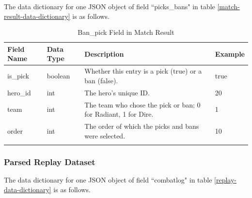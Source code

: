 \documentclass{article}
\begin{document}
The data dictionary for one JSON object of field ``picks\_bans" in table \ref{match-result-data-dictionary} is as follows.

\begin{longtable}{|p{2.5cm}|p{2cm}|p{5.5cm}|p{3cm}|}

\hline
\textbf{Field Name} & \textbf{Data Type} & \textbf{Description}  & \textbf{Example} \\
\hline
\endhead

is\_pick & boolean & Whether this entry is a pick (true) or a ban (false). & true \\
\hline
hero\_id & int & The hero's unique ID. & 20 \\
\hline
team & int & The team who chose the pick or ban; 0 for Radiant, 1 for Dire. & 1 \\
\hline
order & int & The order of which the picks and bans were selected. & 10 \\
\hline
\caption{Ban\_pick Field in Match Result}
\label{ban-pick-in-match-result}
\end{longtable}

\subsubsection{Parsed Replay Dataset}


The data dictionary for one JSON object of field ``combatlog" in table \ref{replay-data-dictionary} is as follows.
\end{document}

